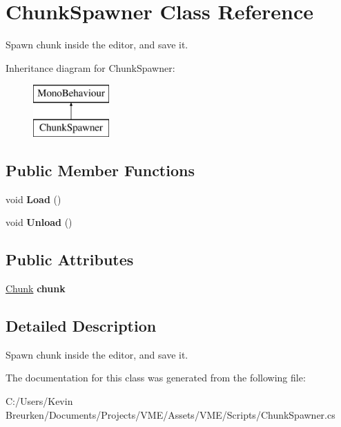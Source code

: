 \hypertarget{class_chunk_spawner}{}\section{Chunk\+Spawner Class Reference}
\label{class_chunk_spawner}


Spawn chunk inside the editor, and save it.  


Inheritance diagram for Chunk\+Spawner\+:\begin{figure}[H]
\begin{center}
\leavevmode
\includegraphics[height=2.000000cm]{class_chunk_spawner}
\end{center}
\end{figure}
\subsection*{Public Member Functions}
\begin{DoxyCompactItemize}
\item 
void {\bfseries Load} ()\hypertarget{class_chunk_spawner_ac03ab97765bb71f200f6e39cdd92a25c}{}\label{class_chunk_spawner_ac03ab97765bb71f200f6e39cdd92a25c}

\item 
void {\bfseries Unload} ()\hypertarget{class_chunk_spawner_a629ab03d88a4479bdf85258cb679eff8}{}\label{class_chunk_spawner_a629ab03d88a4479bdf85258cb679eff8}

\end{DoxyCompactItemize}
\subsection*{Public Attributes}
\begin{DoxyCompactItemize}
\item 
\hyperlink{class_chunk}{Chunk} {\bfseries chunk}\hypertarget{class_chunk_spawner_a3851a334ae9f006109b37513b5211f81}{}\label{class_chunk_spawner_a3851a334ae9f006109b37513b5211f81}

\end{DoxyCompactItemize}


\subsection{Detailed Description}
Spawn chunk inside the editor, and save it. 



The documentation for this class was generated from the following file\+:\begin{DoxyCompactItemize}
\item 
C\+:/\+Users/\+Kevin Breurken/\+Documents/\+Projects/\+V\+M\+E/\+Assets/\+V\+M\+E/\+Scripts/Chunk\+Spawner.\+cs\end{DoxyCompactItemize}
